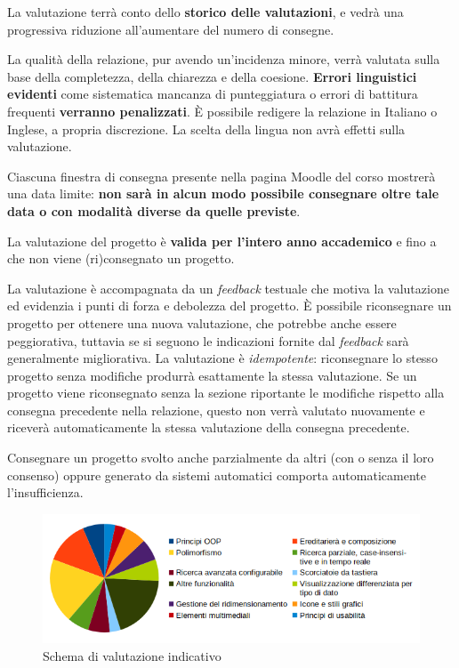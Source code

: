 \documentclass[10pt,a4paper,oneside]{article}
\begin{document}
La valutazione terrà conto dello \textbf{storico delle valutazioni}, e vedrà una progressiva riduzione all'aumentare del numero di consegne.

La qualità della relazione, pur avendo un'incidenza minore, verrà valutata sulla base della completezza, della chiarezza e della coesione. \textbf{Errori linguistici evidenti} come sistematica mancanza di punteggiatura o errori di battitura frequenti \textbf{verranno penalizzati}. È possibile redigere la relazione in Italiano o Inglese, a propria discrezione. La scelta della lingua non avrà effetti sulla valutazione.

Ciascuna finestra di consegna presente nella pagina Moodle del corso mostrerà una data limite: \textbf{non sarà in alcun modo possibile consegnare oltre tale data o con modalità diverse da quelle previste}.

La valutazione del progetto è \textbf{valida per l'intero anno accademico} e fino a che non viene (ri)consegnato un progetto.

La valutazione è accompagnata da un \emph{feedback} testuale che motiva la valutazione ed evidenzia i punti di forza e debolezza del progetto. È possibile riconsegnare un progetto per ottenere una nuova valutazione, che potrebbe anche essere peggiorativa, tuttavia se si seguono le indicazioni fornite dal \emph{feedback} sarà generalmente migliorativa. La valutazione è \emph{idempotente}: riconsegnare lo stesso progetto senza modifiche produrrà esattamente la stessa valutazione. Se un progetto viene riconsegnato senza la sezione riportante le modifiche rispetto alla consegna precedente nella relazione, questo non verrà valutato nuovamente e riceverà automaticamente la stessa valutazione della consegna precedente.

Consegnare un progetto svolto anche parzialmente da altri (con o senza il loro consenso) oppure generato da sistemi automatici comporta automaticamente l'insufficienza.

\begin{figure}[ht]
 \centering
 \includegraphics[width=0.95\linewidth]{assets/evaluation-criteria}
 \caption{Schema di valutazione indicativo}
 \label{fig:evaluation}
\end{figure}
\end{document}
